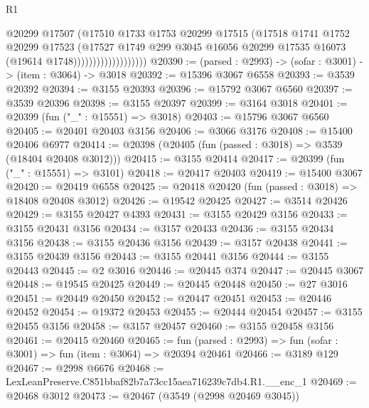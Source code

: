 \begin{lexlean}{R1}
\begin{coremodule}
                                  @20299
                                  @17507
                                  (@17510
                                    @1733
                                    @1753
                                    @20299
                                    @17515
                                    (@17518
                                      @1741
                                      @1752
                                      @20299
                                      @17523
                                      (@17527
                                        @1749
                                        @299
                                        @3045
                                        @16056
                                        @20299
                                        @17535
                                        @16073
                                        (@19614 @1748)))))))))))))))))))
@20390 := (parsed : @2993) -> (sofar : @3001) -> (item : @3064) -> @3018
@20392 := @15396 @3067 @6558
@20393 := @3539 @20392
@20394 := @3155 @20393
@20396 := @15792 @3067 @6560
@20397 := @3539 @20396
@20398 := @3155 @20397
@20399 := @3164 @3018
@20401 := @20399 (fun ("_" : @15551) => @3018)
@20403 := @15796 @3067 @6560
@20405 := @20401 @20403 @3156
@20406 := @3066 @3176
@20408 := @15400 @20406 @6977
@20414 := @20398 (@20405 (fun (passed : @3018) => @3539 (@18404 @20408 @3012)))
@20415 := @3155 @20414
@20417 := @20399 (fun ("_" : @15551) => @3101)
@20418 := @20417 @20403
@20419 := @15400 @3067
@20420 := @20419 @6558
@20425 := @20418 @20420 (fun (passed : @3018) => @18408 @20408 @3012)
@20426 := @19542 @20425
@20427 := @3514 @20426
@20429 := @3155 @20427 @4393
@20431 := @3155 @20429 @3156
@20433 := @3155 @20431 @3156
@20434 := @3157 @20433
@20436 := @3155 @20434 @3156
@20438 := @3155 @20436 @3156
@20439 := @3157 @20438
@20441 := @3155 @20439 @3156
@20443 := @3155 @20441 @3156
@20444 := @3155 @20443
@20445 := @2 @3016
@20446 := @20445 @374
@20447 := @20445 @3067
@20448 := @19545 @20425
@20449 := @20445 @20448
@20450 := @27 @3016
@20451 := @20449 @20450
@20452 := @20447 @20451
@20453 := @20446 @20452
@20454 := @19372 @20453
@20455 := @20444 @20454
@20457 := @3155 @20455 @3156
@20458 := @3157 @20457
@20460 := @3155 @20458 @3156
@20461 := @20415 @20460
@20465 := fun (parsed : @2993) => fun (sofar : @3001) => fun (item : @3064) => @20394 @20461
@20466 := @3189 @129
@20467 := @2998 @6676
@20468 := LexLeanPreserve.C851bbaf82b7a73cc15aea716239c7db4.R1.__enc_1
@20469 := @20468 @3012
@20473 := @20467 (@3549 (@2998 @20469 @3045))

\end{coremodule}
\end{lexlean}

